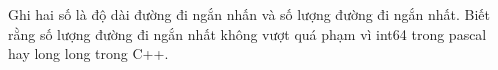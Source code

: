 Ghi hai số là độ dài đường đi ngắn nhấn và số lượng đường đi ngắn nhất. Biết rằng số lượng đường đi ngắn nhất không vượt quá phạm vì int64 trong pascal  hay long long trong C++.  

\